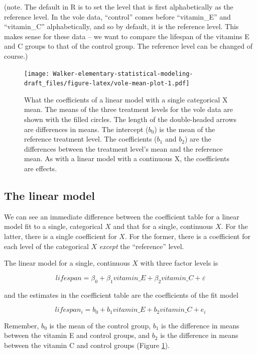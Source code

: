 \documentclass[]{book}
\begin{document}
(note. The default in R is to set the level that is first alphabetically
as the reference level. In the vole data, ``control'' comes before
``vitamin\_E'' and ``vitamin\_C'' alphabetically, and so by default, it
is the reference level. This makes sense for these data -- we want to
compare the lifespan of the vitamins E and C groups to that of the
control group. The reference level can be changed of course.)

\begin{figure}
\centering
\texttt{[image: Walker-elementary-statistical-modeling-draft\_files/figure-latex/vole-mean-plot-1.pdf]}
\caption{\label{fig:vole-mean-plot}What the coefficients of a linear model
with a single categorical X mean. The means of the three treatment
levels for the vole data are shown with the filled circles. The length
of the double-headed arrows are differences in means. The intercept
(\(b_0\)) is the mean of the reference treatment level. The coefficients
(\(b_1\) and \(b_2\)) are the differences between the treatment level's
mean and the reference mean. As with a linear model with a continuous X,
the coefficients are effects.}
\end{figure}

\subsection{The linear model}\label{the-linear-model}

We can see an immediate difference between the coefficient table for a
linear model fit to a single, categorical \(X\) and that for a single,
continuous \(X\). For the latter, there is a single coefficient for
\(X\). For the former, there is a coefficient for each level of the
categorical \(X\) \emph{except} the ``reference'' level.

The linear model for a single, continuous \(X\) with three factor levels
is

\begin{equation}
lifespan = \beta_0 + \beta_1 vitamin\_E + \beta_2 vitamin\_C + \varepsilon
\end{equation}

and the estimates in the coefficient table are the coefficients of the
fit model

\begin{equation}
lifespan_i = b_0 + b_1 vitamin\_E + b_2 vitamin\_C + e_i
\label{eq:model-cat-x}
\end{equation}

Remember, \(b_0\) is the mean of the control group, \(b_1\) is the
difference in means between the vitamin E and control groups, and
\(b_2\) is the difference in means between the vitamin C and control
groups (Figure \ref{fig:vole-mean-plot}).
\end{document}
